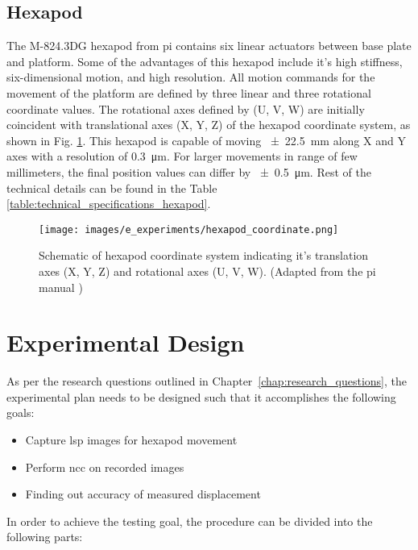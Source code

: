 \subsection{Hexapod}
The M-824.3DG hexapod from \gls{pi} contains six linear actuators between base plate and platform. Some of the advantages of this hexapod include it's high stiffness, six-dimensional motion, and high resolution. All motion commands for the movement of the platform are defined by three linear and three rotational coordinate values. The rotational axes defined by (U, V, W) are initially coincident with translational axes (X, Y, Z) of the hexapod coordinate system, as shown in Fig. \ref{fig:hexapod_coordinate.png}. This hexapod is capable of moving \SI{\pm22.5}{\milli\meter} along X and Y axes with a resolution of \SI{0.3}{\micro\meter}. For larger movements in range of few millimeters, the final position values can differ by \SI{\pm0.5}{\micro\meter}. Rest of the technical details can be found in the Table \ref{table:technical_specifications_hexapod}.

\begin{figure}[ht]
    \centering
    \texttt{[image: images/e\_experiments/hexapod\_coordinate.png]}
    \caption{Schematic of hexapod coordinate system indicating it's translation axes (X, Y, Z) and rotational axes (U, V, W). (Adapted from the \gls{pi} manual \cite{hexapod_manual})}
    \label{fig:hexapod_coordinate.png}
\end{figure}

\clearpage


\section{Experimental Design}

As per the research questions outlined in Chapter\ \ref{chap:research_questions}, the experimental plan needs to be designed such that it accomplishes the following goals:

\begin{itemize}
    \item Capture \gls{lsp} images for hexapod movement
    \item Perform \gls{ncc} on recorded images
    \item Finding out accuracy of measured displacement
\end{itemize}

In order to achieve the testing goal, the procedure can be divided into the following parts:

